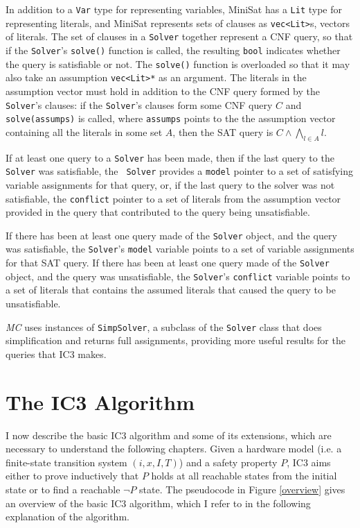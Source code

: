 \documentclass[12pt,a4paper,twoside,openright]{report}
\begin{document}
{In addition to a \verb,Var, type for representing variables, MiniSat has a \verb,Lit, type for
representing literals, and MiniSat represents sets of clauses as \verb,vec<Lit>,s,
vectors of literals. The set of clauses in a \verb,Solver, together represent a CNF query,
so that if the \verb,Solver,'s \verb,solve(), function is called,
the resulting \verb,bool, indicates whether the query is satisfiable or not. The
\verb,solve(), function is overloaded so that it may also take an assumption \verb,vec<Lit>*, as
an argument. The literals in the assumption vector must hold in addition to the CNF query formed
by the \verb,Solver,'s clauses: if the \verb,Solver,'s clauses form some CNF query $C$ and
\verb,solve(assumps), is called, where \verb,assumps, points to the the assumption vector
containing all the literals in some set $A$, then the SAT query is $C \wedge \bigwedge_{l \in A} l$.

If at least one query to a \verb,Solver, has been made, then if the last query to the
\verb,Solver, was satisfiable, the \verb, Solver, provides a \verb,model, pointer
to a set of satisfying variable assignments for that query, or, if the last query to the solver
was not satisfiable, the \verb,conflict, pointer to a set of literals from the assumption
vector provided in the query that contributed to the query being unsatisfiable.

If there has been at least one query made of the \verb,Solver, object, and the query was
satisfiable, the \verb,Solver,'s \verb,model, variable points to a set of variable assignments
for that SAT query.
If there has been at least one query made of the \verb,Solver, object, and the query was
unsatisfiable, the \verb,Solver,'s \verb,conflict, variable points to a set of literals that
contains the assumed literals that caused the query to be unsatisfiable.

\emph{MC} uses instances of \verb,SimpSolver,, a subclass of the \verb,Solver, class
that does simplification and returns full assignments, providing more useful results
for the queries that IC3 makes.

\section{The IC3 Algorithm}
\label{prep:ic3}
I now describe the basic IC3 algorithm and some of its extensions, which are
necessary to understand the following chapters.
Given a hardware model (i.e. a finite-state transition system $(i,x,I,T)$) and a
safety property $P$, IC3 aims either to prove inductively that $P$ holds
at all reachable states from the initial state or
to find a reachable $\neg P$ state.
The pseudocode in Figure \ref{overview} gives an overview of the basic IC3 algorithm,
which I refer to in the following explanation of the algorithm.

}
\end{document}
